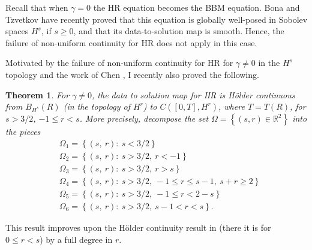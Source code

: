 \documentclass[12pt,reqno]{amsart}
\newcommand{\rr}{\mathbb{R}}
\newtheorem{theorem}{Theorem}
\begin{document}
Recall that when  $\gamma=0$ the HR equation becomes the BBM
equation.  Bona and Tzvetkov \cite{Bona_2009_Sharp-well-pose} have recently
proved  that this equation  is globally well-posed in  Sobolev spaces $H^s$, if
$s \ge 0$, and that its data-to-solution map is smooth. Hence, the failure of
non-uniform continuity for HR does not apply in this case. 

Motivated by the failure of non-uniform continuity for HR for $\gamma \neq 0$ in
the $H^{s}$ topology and the work of Chen \cite{Chen:2011fk}, I recently also proved the following.
%
%
\begin{theorem}
For $\gamma \neq 0$, the
data to solution map for HR is H\"older continuous from $B_{H^{s}}(R)$ (in
the topology of $H^{r}$) to $C([0, T], H^{r})$, where $T = T(R)$, for $s >
3/2$, $-1 \le r < s$. More
precisely, decompose the set $\Omega = \left\{ (s, r) \in \rr^{2}  \right\}$
into the pieces
  \begin{equation*}
  \begin{split}
    & \Omega_{1} = \left\{ (s, \ r):  \ s < 3/2 \right\}
    \\
    & \Omega_{2} = \left\{ (s, \ r):
     \ s>3/2, \ r < -1  \right\}
    \\
    & \Omega_{3} = \left\{ (s, \ r):
     \ s>3/2, \ r > s  \right\}
    \\
    & \Omega_{4} = \left\{ (s, \ r):
     \ s>3/2, \ -1 \le r \le s-1, \ s + r \ge 2  \right\}
    \\
    & \Omega_{5} = \left\{ (s, \ r):
     \ s>3/2, \ -1 \le r < 2-s \right\}
    \\
    & \Omega_{6} = \left\{ (s, \ r):
    \  s>3/2, \  s-1 < r < s  \right\}.
    \end{split}
\end{equation*}
\label{thm:main-thm}
\end{theorem}
%
%
This result improves upon the H\"older continuity result in
\cite{Chen:2011fk} (there it is for $0 \le r < s$) by a full degree in $r$. 
\end{document}
